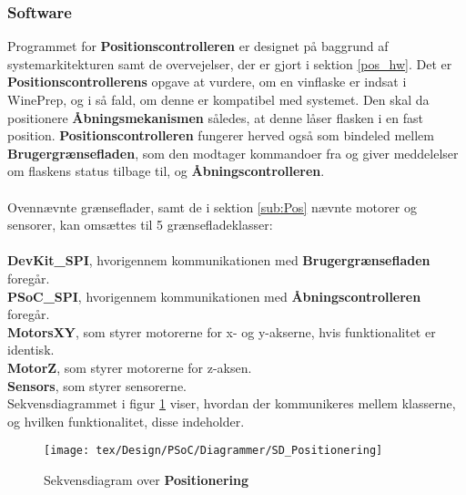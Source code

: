 \subsubsection{Software}
Programmet for \textbf{Positionscontrolleren} er designet på baggrund af systemarkitekturen samt de overvejelser, der er gjort i sektion \ref{pos_hw}. Det er \textbf{Positionscontrollerens} opgave at vurdere, om en vinflaske er indsat i WinePrep, og i så fald, om denne er kompatibel med systemet. Den skal da positionere \textbf{Åbningsmekanismen} således, at denne låser flasken i en fast position. \textbf{Positionscontrolleren} fungerer herved også som bindeled mellem \textbf{Brugergrænsefladen}, som den modtager kommandoer fra og giver meddelelser om flaskens status tilbage til, og \textbf{Åbningscontrolleren}. \\
\\
Ovennævnte grænseflader, samt de i sektion \ref{sub:Pos} nævnte motorer og sensorer, kan omsættes til 5 grænsefladeklasser: \\
\\
\textbf{DevKit\_SPI}, hvorigennem kommunikationen med \textbf{Brugergrænsefladen} foregår. \\
\textbf{PSoC\_SPI}, hvorigennem kommunikationen med \textbf{Åbningscontrolleren} foregår. \\
\textbf{MotorsXY}, som styrer motorerne for x- og y-akserne, hvis funktionalitet er identisk. \\
\textbf{MotorZ}, som styrer motorerne for z-aksen. \\
\textbf{Sensors}, som styrer sensorerne. \\

Sekvensdiagrammet i figur \ref{sd:Pos} viser, hvordan der kommunikeres mellem klasserne, og hvilken funktionalitet, disse indeholder.

\begin{figure}[H]
	\centerline{\texttt{[image: tex/Design/PSoC/Diagrammer/SD\_Positionering]}}
	\caption{Sekvensdiagram over \textbf{Positionering}}
	\label{sd:Pos}
\end{figure}

